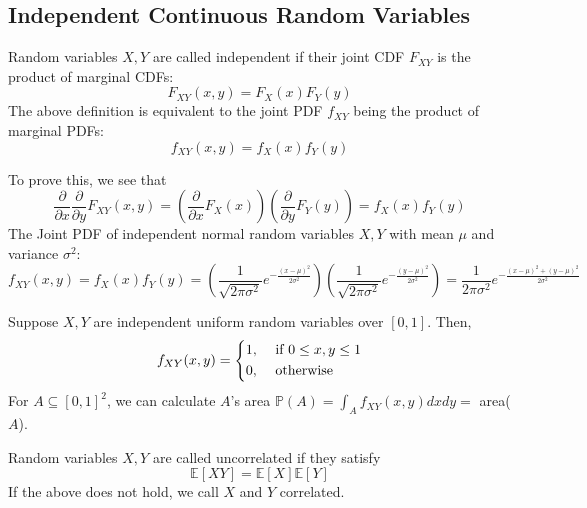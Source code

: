 \subsection{Independent Continuous Random Variables}
\begin{definition}
    Random variables \(X, Y\) are called independent if their joint CDF \(F_{XY}\) is the product of marginal CDFs:
    \[
        F_{XY}(x, y) = F_X(x) F_Y(y) 
    \]
    The above definition is equivalent to the joint PDF \(f_{XY}\) being the product of marginal PDFs:
    \[
        f_{XY}(x, y) = f_X(x) f_Y(y) 
    \]
\end{definition}
To prove this, we see that 
\[
    \frac{\partial}{\partial x} \frac{\partial}{\partial y} F_{XY}(x, y) = (\frac{\partial }{\partial x} F_X(x))(\frac{\partial }{\partial y} F_Y(y)) = f_X(x) f_Y(y)
\]
The Joint PDF of independent normal random variables \(X, Y\) with mean \(\mu\) and variance \(\sigma^2\): 
\[
    f_{XY}(x, y) = f_X(x) f_Y(y) = \left(\dfrac{1}{\sqrt{2\pi \sigma^2}}e^{-\frac{(x - \mu)^2}{2\sigma^2}}\right)\left(\dfrac{1}{\sqrt{2\pi \sigma^2}}e^{-\frac{(y - \mu)^2}{2\sigma^2}}\right) = \dfrac{1}{2\pi \sigma^2}e^{-\frac{(x - \mu)^2 + (y - \mu)^2}{2\sigma^2}}
\] 

\begin{eg}
    Suppose \(X, Y\) are independent uniform random variables over \([0, 1]\). Then,
    \[
        f_{XY}(x, y) = \begin{dcases}
            1 , &\text{ if } 0 \leq x, y \leq 1 \\
            0 , &\text{ otherwise }
        \end{dcases}
    \]
    For \(A \subseteq [0, 1]^2\), we can calculate \(A\)'s area \(\mathbb{P}(A) = \int_A f_{XY}(x, y)dx dy =\) area(\(A\)). 
\end{eg}

\begin{definition}
    Random variables \(X, Y\) are called uncorrelated if they satisfy 
    \[
        \mathbb{E}[XY] = \mathbb{E}[X]\mathbb{E}[Y]
    \]
    If the above does not hold, we call \(X\) and \(Y\) correlated.
\end{definition}

